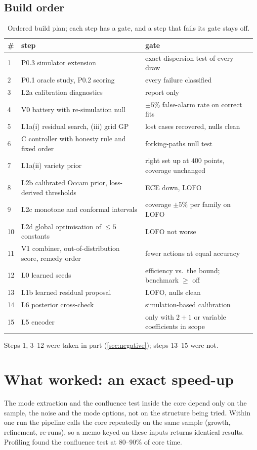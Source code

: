 \documentclass[11pt]{article}
\theoremstyle{plain}
\theoremstyle{definition}
\theoremstyle{remark}
\begin{document}
\subsection{Build order}
\begin{table}[tbp]
\centering\small
\caption{Ordered build plan; each step has a gate, and a step that fails its gate stays off.}\label{tab:order}
\begin{tabular}{@{}p{0.5cm}p{6.7cm}p{4.6cm}@{}}
\toprule
\# & step & gate\\
\midrule
1 & P0.3 simulator extension & exact dispersion test of every draw\\
2 & P0.1 oracle study, P0.2 scoring & every failure classified\\
3 & L2a calibration diagnostics & report only\\
4 & V0 battery with re-simulation null & $\pm5\%$ false-alarm rate on correct fits\\
5 & L1a(i) residual search, (iii) grid GP & lost cases recovered, nulls clean\\
6 & C controller with honesty rule and fixed order & forking-paths null test\\
7 & L1a(ii) variety prior & right set up at $400$ points, coverage unchanged\\
8 & L2b calibrated Occam prior, loss-derived thresholds & ECE down, LOFO\\
9 & L2c monotone and conformal intervals & coverage $\pm5\%$ per family on LOFO\\
10 & L2d global optimisation of $\le5$ constants & LOFO not worse\\
11 & V1 combiner, out-of-distribution score, remedy order & fewer actions at equal accuracy\\
12 & L0 learned seeds & efficiency vs.\ the bound; benchmark $\ge$ off\\
13 & L1b learned residual proposal & LOFO, nulls clean\\
14 & L6 posterior cross-check & simulation-based calibration\\
15 & L5 encoder & only with $2{+}1$ or variable coefficients in scope\\
\bottomrule
\end{tabular}
\end{table}
Steps 1, 3--12 were taken in part (\cref{sec:negative}); steps 13--15 were not.



\section{What worked: an exact speed-up}\label{sec:worked}
The mode extraction and the confluence test inside the core depend only on the sample, the noise and the mode options, not on
the structure being tried. Within one run the pipeline calls the core repeatedly on the same sample (growth, refinement,
re-runs), so a memo keyed on these inputs returns identical results. Profiling found the confluence test at $80$--$90\%$ of core
time.
\end{document}
